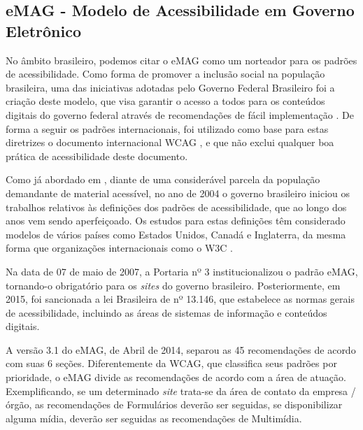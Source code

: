 \subsection{eMAG - Modelo de Acessibilidade em Governo Eletrônico \cite{emag}}
No âmbito brasileiro, podemos citar o eMAG como um norteador para os padrões de acessibilidade. Como forma de promover a inclusão social na população brasileira, uma das iniciativas adotadas pelo Governo Federal Brasileiro foi a criação deste modelo, que visa garantir o acesso a todos para os conteúdos digitais do governo federal através de recomendações de fácil implementação \cite{victormaster}.
De forma a seguir os padrões internacionais, foi utilizado como base para estas diretrizes o documento internacional WCAG \cite{wcag}, e que não exclui qualquer boa prática de acessibilidade deste documento.

Como já abordado em \cite{victormaster}, diante de uma considerável parcela da população demandante de material acessível, no ano de 2004 o governo brasileiro iniciou os trabalhos relativos às definições dos padrões de acessibilidade, que ao longo dos anos vem sendo aperfeiçoado. Os estudos para estas definições têm considerado modelos de vários países como Estados Unidos, Canadá e Inglaterra, da mesma forma que organizações internacionais como o W3C \cite{wai}.

Na data de 07 de maio de 2007, a Portaria nº 3 institucionalizou o padrão eMAG, tornando-o obrigatório para os \textit{sites} do governo brasileiro. Posteriormente, em 2015, foi sancionada a lei Brasileira de nº 13.146, que estabelece as normas gerais de acessibilidade, incluindo as áreas de sistemas de informação e conteúdos digitais.

A versão 3.1 do eMAG, de Abril de 2014, separou as 45 recomendações de acordo com suas 6 seções. Diferentemente da WCAG, que classifica seus padrões por prioridade, o eMAG divide as recomendações de acordo com a área de atuação. Exemplificando, se um determinado \textit{site} trata-se da área de contato da empresa / órgão, as recomendações de Formulários deverão ser seguidas, se disponibilizar alguma mídia, deverão ser seguidas as recomendações de Multimídia.

